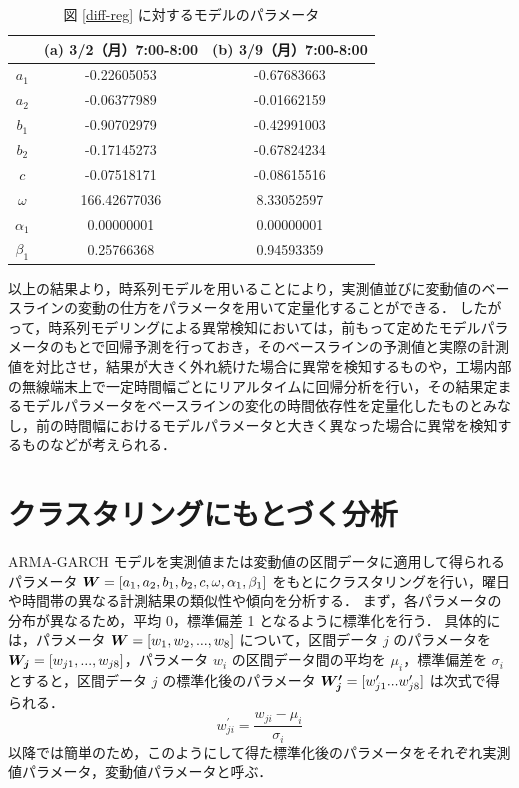 \documentclass[technicalreport]{ieicej}
\begin{document}
\begin{table}[tb]
\centering
\caption{図 \ref{diff-reg} に対するモデルのパラメータ}
\label{diff-param}
\begin{tabular}{|c|c|c|}
\hline
&(a) 3/2（月）7:00-8:00&(b) 3/9（月）7:00-8:00\\
\hline
$a_1$&-0.22605053&-0.67683663\\
\hline
$a_2$&-0.06377989&-0.01662159\\
\hline
$b_1$&-0.90702979&-0.42991003\\
\hline
$b_2$&-0.17145273&-0.67824234\\
\hline
$c$&-0.07518171&-0.08615516\\
\hline
$\omega$&166.42677036&8.33052597\\
\hline
$\alpha_1$&0.00000001&0.00000001\\
\hline
$\beta_1$&0.25766368&0.94593359\\
\hline
\end{tabular}
\end{table}

以上の結果より，時系列モデルを用いることにより，実測値並びに変動値のベースラインの変動の仕方をパラメータを用いて定量化することができる．
したがって，時系列モデリングによる異常検知においては，前もって定めたモデルパラメータのもとで回帰予測を行っておき，そのベースラインの予測値と実際の計測値を対比させ，結果が大きく外れ続けた場合に異常を検知するものや，工場内部の無線端末上で一定時間幅ごとにリアルタイムに回帰分析を行い，その結果定まるモデルパラメータをベースラインの変化の時間依存性を定量化したものとみなし，前の時間幅におけるモデルパラメータと大きく異なった場合に異常を検知するものなどが考えられる．

\section{クラスタリングにもとづく分析}
 ARMA-GARCH モデルを実測値または変動値の区間データに適用して得られるパラメータ $\mbox{\boldmath $W$} = [a_1, a_2, b_1, b_2, c, \omega, \alpha_1, \beta_1]$ をもとにクラスタリングを行い，曜日や時間帯の異なる計測結果の類似性や傾向を分析する．
 まず，各パラメータの分布が異なるため，平均 0，標準偏差 1 となるように標準化を行う．
具体的には，パラメータ $\mbox{\boldmath $W$} = [w_1,w_2,...,w_8]$ について，区間データ $j$ のパラメータを $\mbox{\boldmath $W_j$} = [w_{j1},...,w_{j8}]$，パラメータ $w_i$ の区間データ間の平均を $\mu_i$，標準偏差を $\sigma_i$ とすると，区間データ $j$ の標準化後のパラメータ $\mbox{\boldmath $W_j^\prime$} = [w_{j1}^\prime...w_{j8}^\prime]$ は次式で得られる．
$$w_{ji}^\prime = \frac{w_{ji} - \mu_i}{\sigma_i}$$
以降では簡単のため，このようにして得た標準化後のパラメータをそれぞれ実測値パラメータ，変動値パラメータと呼ぶ． 
\end{document}
